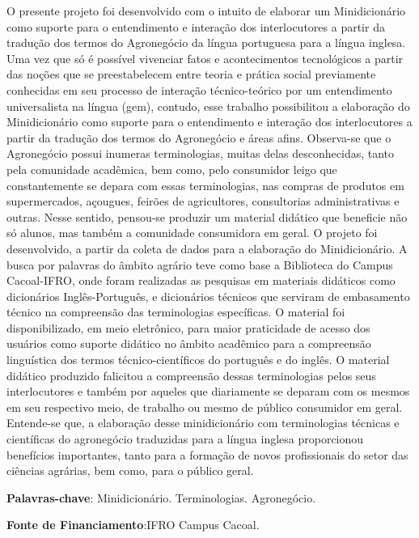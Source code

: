 \documentclass[article,12pt,onesidea,4paper,english,brazil]{abntex2}
\begin{document}
	\noindent O presente projeto foi desenvolvido com o intuito de elaborar um
	Minidicionário como suporte para o entendimento e interação dos interlocutores a
	partir da tradução dos termos do Agronegócio da língua portuguesa para a língua
	inglesa. Uma vez que só é possível vivenciar fatos e acontecimentos tecnológicos a
	partir das noções que se preestabelecem entre teoria e prática social previamente
	conhecidas em seu processo de interação técnico-teórico por um entendimento
	universalista na língua (gem), contudo, esse trabalho possibilitou a elaboração do
	Minidicionário como suporte para o entendimento e interação dos interlocutores a
	partir da tradução dos termos do Agronegócio e áreas afins. Observa-se que o
	Agronegócio possui inumeras terminologias, muitas delas desconhecidas, tanto pela
	comunidade acadêmica, bem como, pelo consumidor leigo que constantemente se
	depara com essas terminologias, nas compras de produtos em supermercados,
	açougues, feirões de agricultores, consultorias administrativas e outras. Nesse
	sentido, pensou-se produzir um material didático que beneficie não só alunos, mas
	também a comunidade consumidora em geral. O projeto foi desenvolvido, a partir da
	coleta de dados para a elaboração do Minidicionário. A busca por palavras do
	âmbito agrário teve como base a Biblioteca do Campus Cacoal-IFRO, onde foram
	realizadas as pesquisas em materiais didáticos como dicionários Inglês-Português, e
	dicionários técnicos que serviram de embasamento técnico na compreensão das
	terminologias específicas. O material foi disponibilizado, em meio eletrônico, para
	maior praticidade de acesso dos usuários como suporte didático no âmbito
	acadêmico para a compreensão linguística dos termos técnico-científicos do
	português e do inglês. O material didático produzido falicitou a compreensão dessas
	terminologias pelos seus interlocutores e também por aqueles que diariamente se
	deparam com os mesmos em seu respectivo meio, de trabalho ou mesmo de público
	consumidor em geral. Entende-se que, a elaboração desse minidicionário com
	terminologias técnicas e científicas do agronegócio traduzidas para a língua inglesa
	proporcionou benefícios importantes, tanto para a formação de novos profissionais
	do setor das ciências agrárias, bem como, para o público geral.
	
	\vspace{\onelineskip}
	
	\noindent
	\textbf{Palavras-chave}: Minidicionário. Terminologias. Agronegócio.
	  
	\noindent
	\textbf{Fonte de Financiamento}:IFRO Campus Cacoal.
	
\end{document}
